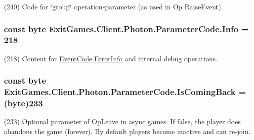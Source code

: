 (240) Code for \char`\"{}group\char`\"{} operation-\/parameter (as used in Op Raise\+Event).

\subsubsection[{\texorpdfstring{Info}{Info}}]{\setlength{\rightskip}{0pt plus 5cm}const byte Exit\+Games.\+Client.\+Photon.\+Parameter\+Code.\+Info = 218}\hypertarget{class_exit_games_1_1_client_1_1_photon_1_1_parameter_code_ad7faa8ed1297c1ca6954f85cff1e7da2}{}\label{class_exit_games_1_1_client_1_1_photon_1_1_parameter_code_ad7faa8ed1297c1ca6954f85cff1e7da2}


(218) Content for \hyperlink{class_exit_games_1_1_client_1_1_photon_1_1_event_code_a5515318245655c141be84934f461053c}{Event\+Code.\+Error\+Info} and internal debug operations.

\subsubsection[{\texorpdfstring{Is\+Coming\+Back}{IsComingBack}}]{\setlength{\rightskip}{0pt plus 5cm}const byte Exit\+Games.\+Client.\+Photon.\+Parameter\+Code.\+Is\+Coming\+Back = (byte)233}\hypertarget{class_exit_games_1_1_client_1_1_photon_1_1_parameter_code_aafa0f3452290ec0f74bdb406580fe31a}{}\label{class_exit_games_1_1_client_1_1_photon_1_1_parameter_code_aafa0f3452290ec0f74bdb406580fe31a}


(233) Optional parameter of Op\+Leave in async games. If false, the player does abandons the game (forever). By default players become inactive and can re-\/join.

